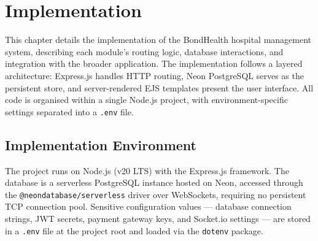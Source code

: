 \chapter{Implementation}
\label{ch:implementation}

\justifying
\noindent This chapter details the implementation of the BondHealth hospital management system, describing each module's routing logic, database interactions, and integration with the broader application. The implementation follows a layered architecture: Express.js handles HTTP routing, Neon PostgreSQL serves as the persistent store, and server-rendered EJS templates present the user interface. All code is organised within a single Node.js project, with environment-specific settings separated into a \texttt{.env} file.

\section{Implementation Environment}
\label{sec:impl-env}

\justifying
\noindent The project runs on Node.js (v20 LTS) with the Express.js framework. The database is a serverless PostgreSQL instance hosted on Neon, accessed through the \texttt{@neondatabase/serverless} driver over WebSockets, requiring no persistent TCP connection pool. Sensitive configuration values — database connection strings, JWT secrets, payment gateway keys, and Socket.io settings — are stored in a \texttt{.env} file at the project root and loaded via the \texttt{dotenv} package.

